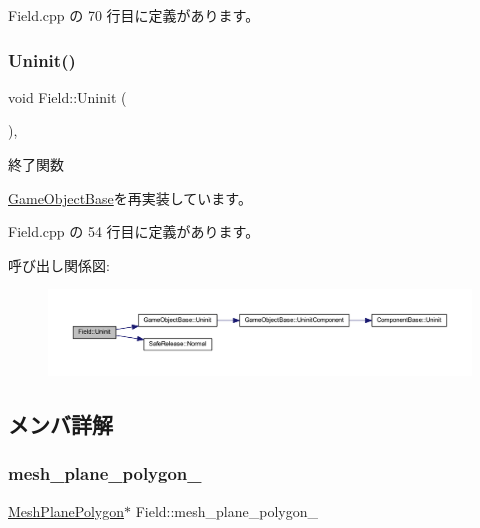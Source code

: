  Field.\+cpp の 70 行目に定義があります。

\mbox{\label{class_field_a6d1015e2409daa87cd00485ac1efc06b}} 
\subsubsection{\texorpdfstring{Uninit()}{Uninit()}}
{\footnotesize\ttfamily void Field\+::\+Uninit (\begin{DoxyParamCaption}{ }\end{DoxyParamCaption})\hspace{0.3cm}{\ttfamily [override]}, {\ttfamily [virtual]}}



終了関数 



\mbox{\hyperlink{class_game_object_base_a97e1bc277d7b1c0156d4735de29a022c}{Game\+Object\+Base}}を再実装しています。



 Field.\+cpp の 54 行目に定義があります。

呼び出し関係図\+:\nopagebreak
\begin{figure}[H]
\begin{center}
\leavevmode
\includegraphics[width=350pt]{class_field_a6d1015e2409daa87cd00485ac1efc06b_cgraph}
\end{center}
\end{figure}


\subsection{メンバ詳解}
\mbox{\label{class_field_a5c4ad4d2fea2269e7ab2185cf09beb10}} 
\subsubsection{\texorpdfstring{mesh\+\_\+plane\+\_\+polygon\+\_\+}{mesh\_plane\_polygon\_}}
{\footnotesize\ttfamily \mbox{\hyperlink{class_mesh_plane_polygon}{Mesh\+Plane\+Polygon}}$\ast$ Field\+::mesh\+\_\+plane\+\_\+polygon\+\_\+}



